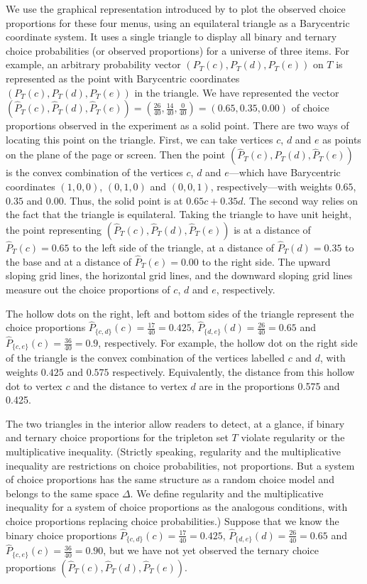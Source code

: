 \documentclass[11pt,letter]{article}
\newcommand{\trip}{T}
\begin{document}
We use the graphical representation introduced by \citet{McCaMarl13} to plot the observed choice proportions for these four menus, using an equilateral triangle as a Barycentric coordinate system.
It uses a single triangle to display all binary and ternary choice probabilities (or observed proportions) for a universe of three items.
For example, an arbitrary probability vector $(P_\trip(c),P_\trip(d),P_\trip(e))$ on $\trip$ is represented as the point with Barycentric coordinates $(P_\trip(c),P_\trip(d),P_\trip(e))$ in the triangle.
We have represented the vector $(\hat P_\trip(c), \hat P_\trip(d), \hat P_\trip(e)) = (\tfrac{26}{40}, \tfrac{14}{40}, \tfrac{0}{40}) = (0.65, 0.35, 0.00)$ of choice proportions observed in the experiment as a solid point.
There are two ways of locating this point on the triangle.
First, we can take vertices $c$, $d$ and $e$ as points on the plane of the page or screen.
Then the point $(\hat P_\trip(c),\hat P_\trip(d),\hat P_\trip(e))$ is the convex combination of the vertices $c$, $d$ and $e$---which have Barycentric coordinates $(1,0,0)$, $(0,1,0)$ and $(0,0,1)$, respectively---with weights $0.65$, $0.35$ and $0.00$.
Thus, the solid point is at $0.65 c + 0.35 d$.
The second way relies on the fact that the triangle is equilateral.
Taking the triangle to have unit height, the point representing $(\hat P_\trip(c),\hat P_\trip(d),\hat P_\trip(e))$ is at a distance of $\hat P_\trip(c) = 0.65$ to the left side of the triangle, at a distance of $\hat P_\trip(d) = 0.35$ to the base and at a distance of $\hat P_\trip(e) = 0.00$ to the right side.
The upward sloping grid lines, the horizontal grid lines, and the downward sloping grid lines measure out the choice proportions of $c$, $d$ and $e$, respectively.

The hollow dots on the right, left and bottom sides of the triangle represent the choice proportions $\hat P_{\{c,d\}}(c) = \tfrac{17}{40} = 0.425$, $\hat P_{\{d,e\}}(d) = \tfrac{26}{40} = 0.65$ and $\hat P_{\{c,e\}}(c) = \tfrac{36}{40} = 0.9$, respectively.
For example, the hollow dot on the right side of the triangle is the convex combination of the vertices labelled $c$ and $d$, with weights $0.425$ and $0.575$ respectively.
Equivalently, the distance from this hollow dot to vertex $c$ and the distance to vertex $d$ are in the proportions 0.575 and 0.425.

The two triangles in the interior allow readers to detect, at a glance, if binary and ternary choice proportions for the tripleton set $\trip$ violate regularity or the multiplicative inequality.
(Strictly speaking, regularity and the multiplicative inequality are restrictions on choice probabilities, not proportions.
But a system of choice proportions has the same structure as a random choice model and belongs to the same space $\Delta$.
We define regularity and the multiplicative inequality for a system of choice proportions as the analogous conditions, with choice proportions replacing choice probabilities.)
Suppose that we know the binary choice proportions $\hat P_{\{c,d\}}(c) = \tfrac{17}{40} = 0.425$, $\hat P_{\{d,e\}}(d) = \tfrac{26}{40} = 0.65$ and $\hat P_{\{c,e\}}(c) = \tfrac{36}{40} = 0.90$, but we have not yet observed the ternary choice proportions $(\hat P_\trip(c), \hat P_\trip(d), \hat P_\trip(e))$.
\end{document}

